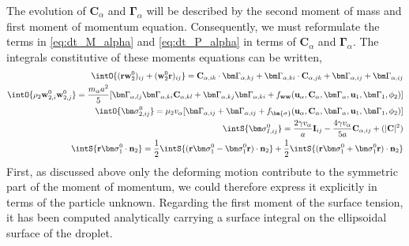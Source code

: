 The evolution of $\textbf{C}_\alpha$ and $\bm\Gamma_\alpha$ will be described by the second moment of mass and first moment of momentum equation.
Consequently, we must reformulate the terms in \ref{eq:dt_M_alpha} and \ref{eq:dt_P_alpha} in terms of $\textbf{C}_\alpha$ and $\bm\Gamma_\alpha$. 
The integrals constitutive of these moments equations can be written, 
\begin{align}
    \intO{(\textbf{rw}_2^0 )_{ij}+ (\textbf{w}_2^0 \textbf{r})_{ij}} 
    = \textbf{C}_{\alpha,ik} \cdot \bm\Gamma_{\alpha,kj}
    +  \bm\Gamma_{\alpha,ki} \cdot \textbf{C}_{\alpha,jk}
    +  \bm\Gamma_{\alpha,ij} + \bm\Gamma_{\alpha,ij}
    \\
    \intO{\rho_2 \textbf{w}_{2,i}^0\textbf{w}_{2,j}^0}
    = \frac{m_\alpha a^2}{5}[
        \bm\Gamma_{\alpha,lj}\bm\Gamma_{\alpha,ki} \textbf{C}_{\alpha,kl} 
        + \bm\Gamma_{\alpha,kj}\bm\Gamma_{\alpha,ki} 
        + f_\textbf{ww}(\textbf{u}_\alpha,\textbf{C}_\alpha,\bm\Gamma_\alpha,\textbf{u}_1,\bm \Gamma_1,\phi_2)
        ]
    \\
    \intO{\bm\sigma_{2,ij}^0}
    =
    \mu_2 v_\alpha [\bm\Gamma_{\alpha,ij} + \bm\Gamma_{\alpha,ij}
    + f_{\bm{\sigma}}(\textbf{u}_\alpha,\textbf{C}_\alpha,\bm\Gamma_\alpha,\textbf{u}_1,\bm \Gamma_1,\phi_2)]
    \\
    \intS{\bm\sigma_{I,ij}^0}
    = \frac{2 \gamma v_\alpha }{a} \textbf{I}_{ij} - \frac{4 \gamma v_\alpha }{5 a} \textbf{C}_{\alpha,ij}
    +\mathcal(|\textbf{C}|^2)\\
    \intS{\textbf{r}\bm\sigma_1^0\cdot \textbf{n}_2}
    = 
    \frac{1}{2}\intS{(\textbf{r}\bm\sigma_1^0-\bm\sigma_1^0\textbf{r})\cdot \textbf{n}_2}
    + \frac{1}{2}\intS{(\textbf{r}\bm\sigma_1^0+\bm\sigma_1^0\textbf{r})\cdot \textbf{n}_2}
\end{align}
First, as discussed above only the deforming motion contribute to the symmetric part of the moment of momentum, we could therefore express it explicitly in terms of the particle unknown. 
Regarding the first moment of the surface tension, it has been computed analytically carrying a surface integral on the ellipsoidal surface of the droplet. 
